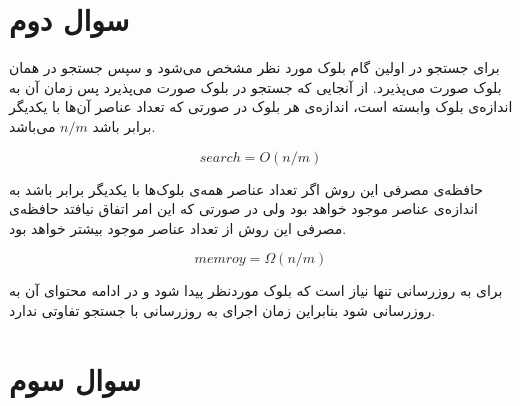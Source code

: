 \documentclass[paper=a4, fontsize=11pt]{article}
\numberwithin{equation}{section} %
\numberwithin{figure}{section} %
\numberwithin{table}{section} %
\begin{document}
\section{سوال دوم}
\par
برای جستجو در اولین گام بلوک مورد نظر مشخص می‌شود و سپس جستجو در همان بلوک صورت می‌پذیرد.
از آنجایی که جستجو در بلوک صورت می‌پذیرد پس زمان آن به اندازه‌ی بلوک وابسته است،
اندازه‌ی هر بلوک در صورتی که تعداد عناصر آن‌ها با یکدیگر برابر باشد
$n/m$
می‌باشد.

$$
search = O(n/m)
$$

\par
حافظه‌ی مصرفی این روش اگر تعداد عناصر همه‌ی بلوک‌ها با یکدیگر برابر باشد
به اندازه‌ی عناصر موجود خواهد بود ولی
در صورتی که این امر اتفاق نیافتد
حافظه‌ی مصرفی این روش از تعداد عناصر موجود بیشتر خواهد بود.

$$
memroy = \Omega(n/m)
$$

\par
برای به روزرسانی تنها نیاز است که بلوک موردنظر پیدا شود
و در ادامه محتوای آن به روزرسانی شود
بنابراین زمان اجرای به روزرسانی با جستجو تفاوتی ندارد.

\section{سوال سوم}
\end{document}
